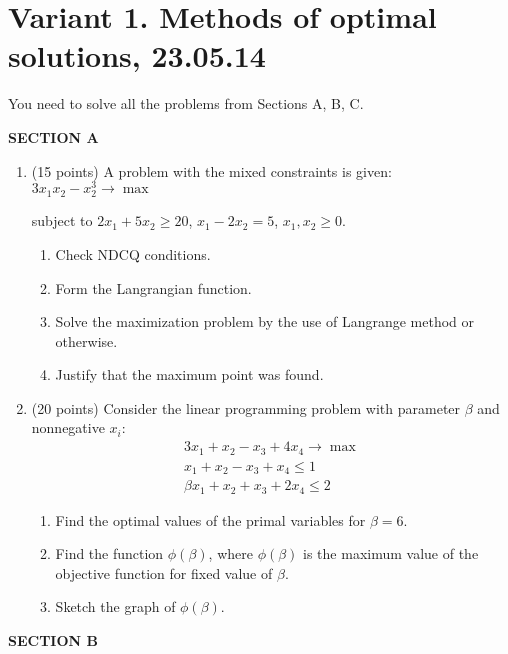 \documentclass[12pt,a4paper]{article}
\begin{document}
\section*{Variant 1. Methods of optimal solutions, 23.05.14}

You need to solve all the problems from Sections A, B, C.

\pagestyle{empty}

\textbf{SECTION A}

\begin{enumerate}[resume]
\item (15 points) A problem with the mixed constraints is given: $3x_1 x_2-x_2^3 \to \max$

subject to $2x_1+5x_2 \geq 20$, $x_1-2x_2=5$, $x_1, x_2 \geq 0$.
\begin{enumerate}
\item Check NDCQ conditions.
\item  Form the Langrangian function.
\item Solve the maximization problem by the use of Langrange method or otherwise.
\item Justify that the maximum point was found.
\end{enumerate}
\item  (20 points)   Consider the linear programming problem with parameter $\beta$ and nonnegative $x_i$:
\begin{align*}
3x_1+x_2-x_3+4x_4 \to \max \\
x_1+x_2-x_3+x_4\leq 1 \\
\beta x_1+x_2+x_3+2x_4 \leq 2
\end{align*}

\begin{enumerate}
\item Find the optimal values of the primal variables for $\beta=6$.
\item Find the function $\phi(\beta)$, where $\phi(\beta)$  is the maximum value of the objective function for fixed value of $\beta$.
\item Sketch the graph of $\phi(\beta)$.
\end{enumerate}


\end{enumerate}

\textbf{SECTION B}
\end{document}

